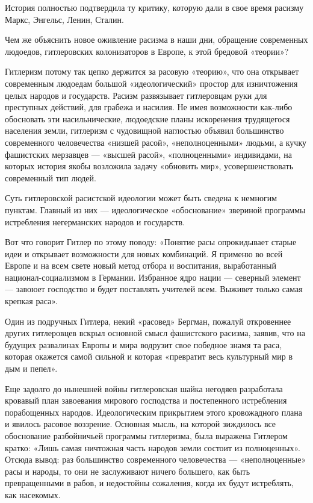 \documentclass[12pt, a4paper, openany]{book}
\begin{document}
История полностью подтвердила ту критику, которую дали в свое время расизму Маркс, Энгельс, Ленин, Сталин.

Чем же объяснить новое оживление расизма в наши дни, обращение современных людоедов, гитлеровских колонизаторов в Европе, к этой бредовой «теории»?

Гитлеризм потому так цепко держится за расовую «теорию», что она открывает современным людоедам большой «идеологический» простор для изничтожения целых народов и государств. Расизм развязывает гитлеровцам руки для преступных действий, для грабежа и насилия. Не имея возможности как-либо обосновать эти насильнические, людоедские планы искоренения трудящегося населения земли, гитлеризм с чудовищной наглостью объявил большинство современного человечества «низшей расой», «неполноценными» людьми, а кучку фашистских мерзавцев — «высшей расой», «полноценными» индивидами, на которых история якобы возложила задачу «обновить мир», усовершенствовать современный тип людей.

Суть гитлеровской расистской идеологии может быть сведена к немногим пунктам. Главный из них — идеологическое «обоснование» звериной программы истребления негерманских народов и государств.

Вот что говорит Гитлер по этому поводу: «Понятие расы опрокидывает старые идеи и открывает возможности для новых комбинаций. Я применю во всей Европе и на всем свете новый метод отбора и воспитания, выработанный национал-социализмом в Германии. Избранное ядро нации — северный элемент — завоюет господство и будет поставлять учителей всем. Выживет только самая крепкая раса».

Один из подручных Гитлера, некий «расовед» Бергман, пожалуй откровеннее других гитлеровцев вскрыл основной смысл фашистского расизма, заявив, что на будущих развалинах Европы и мира водрузит свое победное знамя та раса, которая окажется самой сильной и которая «превратит весь культурный мир в дым и пепел».

Еще задолго до нынешней войны гитлеровская шайка негодяев разработала кровавый план завоевания мирового господства и постепенного истребления порабощенных народов. Идеологическим прикрытием этого кровожадного плана и явилось расовое воззрение. Основная мысль, на которой зиждилось все обоснование разбойничьей программы гитлеризма, была выражена Гитлером кратко: «Лишь самая ничтожная часть народов земли состоит из полноценных». Отсюда вывод: раз большинство современного человечества — «неполноценные» расы и народы, то они не заслуживают ничего большего, как быть превращенными в рабов, и недостойны сожаления, когда их будут истреблять, как насекомых.
\end{document}
